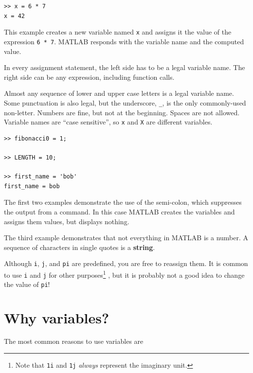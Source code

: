 \documentclass[
]{book}
\begin{document}
\begin{verbatim}
>> x = 6 * 7
x = 42
\end{verbatim}

This example creates a new variable named {\tt x} and assigns it the
value of the expression {\tt 6 * 7}.  MATLAB responds with the
variable name and the computed value.

In every assignment statement, the left side has to be a
legal variable name.  The right side can be any expression,
including function calls.

Almost any sequence of lower and upper case letters is a legal
variable name.  Some punctuation is also legal, but the underscore,
{\tt \_}, is the only commonly-used non-letter.  Numbers are fine, but
not at the beginning.  Spaces are not allowed.  Variable names are
``case sensitive'', so {\tt x} and {\tt X} are different variables.

\begin{verbatim}
>> fibonacci0 = 1;

>> LENGTH = 10;

>> first_name = 'bob'
first_name = bob
\end{verbatim}

The first two examples demonstrate the use of the semi-colon, which
suppresses the output from a command.  In this case MATLAB creates the
variables and assigns them values, but displays nothing.

The third example demonstrates that not everything
in MATLAB is a number.  A sequence of characters in single quotes is
a {\bf string}.

Although {\tt i}, {\tt j}, and {\tt pi} are predefined, you are free
to reassign them.  It is common to use {\tt i} and {\tt j} for other
purposes\footnote{Note that {\tt 1i} and {\tt 1j} \textit{always}
represent the imaginary unit.}
, but it is probably not a good idea to change the value of
{\tt pi}!

\section{Why variables?}

The most common reasons to use variables are
\end{document}
